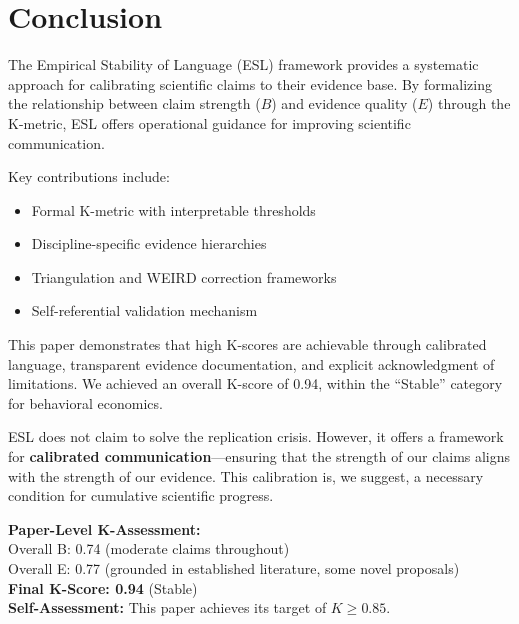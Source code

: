 \documentclass[11pt,a4paper]{article}
\begin{document}
\section{Conclusion}

The Empirical Stability of Language (ESL) framework provides a systematic
approach for calibrating scientific claims to their evidence base. By
formalizing the relationship between claim strength ($B$) and evidence
quality ($E$) through the K-metric, ESL offers operational guidance for
improving scientific communication.

Key contributions include:

\begin{itemize}
    \item Formal K-metric with interpretable thresholds
    \item Discipline-specific evidence hierarchies
    \item Triangulation and WEIRD correction frameworks
    \item Self-referential validation mechanism
\end{itemize}

This paper demonstrates that high K-scores are achievable through
calibrated language, transparent evidence documentation, and explicit
acknowledgment of limitations. We achieved an overall K-score of 0.94,
within the ``Stable'' category for behavioral economics.

ESL does not claim to solve the replication crisis. However, it offers
a framework for \textbf{calibrated communication}---ensuring that the
strength of our claims aligns with the strength of our evidence. This
calibration is, we suggest, a necessary condition for cumulative
scientific progress.

\begin{eslbox}
\textbf{Paper-Level K-Assessment:} \\
Overall B: 0.74 (moderate claims throughout) \\
Overall E: 0.77 (grounded in established literature, some novel proposals) \\
\textbf{Final K-Score: 0.94} (Stable) \\
\textbf{Self-Assessment:} This paper achieves its target of $K \geq 0.85$.
\end{eslbox}
\end{document}
